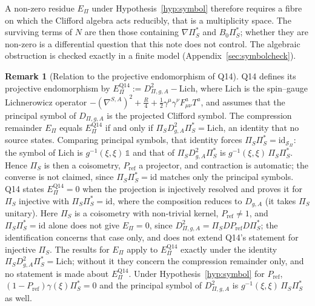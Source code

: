 \documentclass[11pt]{article}
\theoremstyle{definition}
\newtheorem{remark}{Remark}
\newcommand{\EPi}{E_\Pi}
\newcommand{\PiS}{\Pi_S}
\begin{document}
    A non-zero residue $\EPi$ under Hypothesis~\ref{hyp:symbol} therefore requires a fibre on which the Clifford algebra
    acts reducibly, that is a multiplicity space.
    The surviving terms of $N$ are then those containing $\nabla\PiS^{*}$ and $B_0\PiS^{*}$; whether they are
    non-zero is a differential question that this note does not control.
    The algebraic obstruction is checked exactly in a finite model (Appendix~\ref{sec:symbolcheck}).

    \begin{remark}[Relation to the projective endomorphism of Q14]
      \label{rem:q14-symbol}
      Q14 defines its projective endomorphism by $\EPi^{\mathrm{Q14}}:=D^2_{\Pi,g,A}-\mathrm{Lich}$, where
      $\mathrm{Lich}$ is the spin--gauge Lichnerowicz operator
      $-(\nabla^{S,A})^2+\tfrac{R}{4}+\tfrac12\gamma^\mu\gamma^\nu F^a_{\mu\nu}T^a$, and assumes that the principal
      symbol of $D_{\Pi,g,A}$ is the projected Clifford symbol.
      The compression remainder $\EPi$ equals $\EPi^{\mathrm{Q14}}$ if and only if
      $\PiS D_{g,A}^2\PiS^{*}=\mathrm{Lich}$, an identity that no source states.
      Comparing principal symbols, that identity forces $\PiS\PiS^{*}=\mathrm{id}_{\mathcal S_\Pi}$: the symbol of
      $\mathrm{Lich}$ is $g^{-1}(\xi,\xi)\,\mathbb 1$ and that of $\PiS D_{g,A}^2\PiS^{*}$ is
      $g^{-1}(\xi,\xi)\,\PiS\PiS^{*}$.
      Hence $\PiS$ is then a coisometry, $P_{\mathrm{ref}}$ a projector, and contraction is automatic; the converse is
      not claimed, since $\PiS\PiS^{*}=\mathrm{id}$ matches only the principal symbols.
      Q14 states $\EPi^{\mathrm{Q14}}=0$ when the projection is injectively resolved and proves it for $\PiS$
      injective with $\PiS\PiS^{*}=\mathrm{id}$, where the composition reduces to $D_{g,A}$ (it takes $\PiS$ unitary).
      Here $\PiS$ is a coisometry with non-trivial kernel, $P_{\mathrm{ref}}\neq1$, and $\PiS\PiS^{*}=\mathrm{id}$
      alone does not give $\EPi=0$, since $D^2_{\Pi,g,A}=\PiS D P_{\mathrm{ref}} D\PiS^{*}$; the identification
      concerns that case only, and does not extend Q14's statement for injective $\PiS$.
      The results for $\EPi$ apply to $\EPi^{\mathrm{Q14}}$ exactly under the identity
      $\PiS D_{g,A}^2\PiS^{*}=\mathrm{Lich}$; without it they concern the compression remainder only, and no statement
      is made about $\EPi^{\mathrm{Q14}}$.
      Under Hypothesis~\ref{hyp:symbol} for $P_{\mathrm{ref}}$, $(1-P_{\mathrm{ref}})\gamma(\xi)\PiS^{*}=0$ and the
      principal symbol of $D^2_{\Pi,g,A}$ is $g^{-1}(\xi,\xi)\,\PiS\PiS^{*}$ as well.
    \end{remark}
\end{document}
